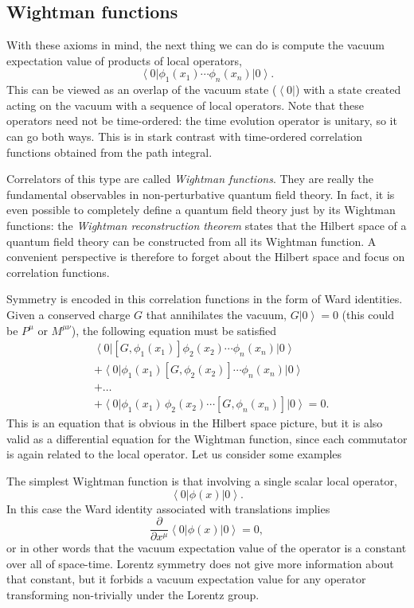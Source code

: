 \documentclass[a4paper,12pt]{article}
\newcommand{\ket}[1]{\left| #1 \right\rangle}
\newcommand{\bra}[1]{\left\langle #1 \right|}
\numberwithin{equation}{section}
\begin{document}
\subsection{Wightman functions}

With these axioms in mind, the next thing we can do is compute the vacuum expectation value of products of local operators,
\begin{equation}
	\bra{0} \phi_1(x_1) \cdots \phi_n(x_n) \ket{0}.
\end{equation}
This can be viewed as an overlap of the vacuum state ($\bra{0}$) with a  state created acting on the vacuum with a sequence of local operators. Note that these operators need not be time-ordered: the time evolution operator is unitary, so it can go both ways. This is in stark contrast with time-ordered correlation functions obtained from the path integral.

Correlators of this type are called \emph{Wightman functions}. They are really the fundamental observables in non-perturbative quantum field theory. In fact, it is even possible to completely define a quantum field theory just by its Wightman functions: the \emph{Wightman reconstruction theorem} states that the Hilbert space of a quantum field theory can be constructed from all its Wightman function.
A convenient perspective is therefore to forget about the Hilbert space and focus on correlation functions.

Symmetry is encoded in this correlation functions in the form of Ward identities. Given a conserved charge $G$ that annihilates the vacuum, $G \ket{0} = 0$ (this could be $P^\mu$ or $M^{\mu\nu}$), the following equation must be satisfied
\begin{align}
	& \bra{0} \left[ G, \phi_1(x_1) \right] \phi_2(x_2) \cdots 
	\phi_n(x_n) \ket{0}
	\nonumber \\
	& + \bra{0} \phi_1(x_1) \left[ G, \phi_2(x_2) \right] \cdots 
	\phi_n(x_n) \ket{0}
	\nonumber \\
	& + \ldots
	\nonumber \\
	& + \bra{0} \phi_1(x_1) \, \phi_2(x_2) \cdots 
	\left[ G, \phi_n(x_n) \right] \ket{0} = 0.
\end{align}
This is an equation that is obvious in the Hilbert space picture, but it is also valid as a differential equation for the Wightman function, since each commutator is again related to the local operator. Let us consider some examples

The simplest Wightman function is that involving a single scalar local operator, 
\begin{equation}
	\bra{0} \phi(x) \ket{0}.
\end{equation}
In this case the Ward identity associated with translations implies
\begin{equation}
	\frac{\partial}{\partial x^\mu}
	\bra{0} \phi(x) \ket{0} = 0,
\end{equation}
or in other words that the vacuum expectation value of the operator is a constant over all of space-time. Lorentz symmetry does not give more information about that constant, but it forbids a vacuum expectation value for any operator transforming non-trivially under the Lorentz group.
\end{document}
